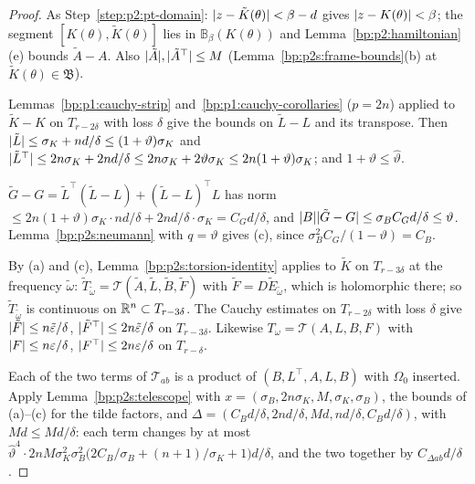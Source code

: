 \begin{proof}
\label{step:p2s:pt-domain}
As Step~\ref{step:p2:pt-domain}: $\lvert z-\tilde K(\theta)\rvert<\beta-d$ gives $\lvert z-K(\theta)\rvert<\beta$; the segment $[K(\theta),\tilde K(\theta)]$ lies in
$\mathbb B_\beta(K(\theta))$ and Lemma~\ref{bp:p2:hamiltonian}(e) bounds $\tilde A-A$. Also $\lvert \tilde A\rvert,\lvert \tilde A^\top\rvert\le M$
(Lemma~\ref{bp:p2s:frame-bounds}(b) at $\tilde K(\theta)\in\mathfrak B$).

\label{step:p2s:pt-l}
Lemmas~\ref{bp:p1:cauchy-strip} and~\ref{bp:p1:cauchy-corollaries} ($p=2n$) applied to $\tilde K-K$ on $T_{r-2\delta}$ with loss $\delta$ give
the bounds on $\tilde L-L$ and its transpose. Then $\lvert \tilde L\rvert\le\sigma_K+nd/\delta\le(1+\vartheta)\sigma_K$ and
$\lvert \tilde L^\top\rvert\le2n\sigma_K+2nd/\delta\le2n\sigma_K+2\vartheta\sigma_K\le2n(1+\vartheta)\sigma_K$; and $1+\vartheta\le\hat\vartheta$.

\label{step:p2s:pt-b}
$\tilde G-G=\tilde L^\top(\tilde L-L)+(\tilde L-L)^\top L$ has norm $\le2n(1+\vartheta)\sigma_K\cdot nd/\delta+2nd/\delta\cdot\sigma_K=C_Gd/\delta$, and
$\lvert B\rvert\lvert \tilde G-G\rvert\le\sigma_BC_Gd/\delta\le\vartheta$. Lemma~\ref{bp:p2s:neumann} with $q=\vartheta$ gives (c), since
$\sigma_B^2C_G/(1-\vartheta)=C_B$.

\label{step:p2s:pt-tt}
By (a) and (c), Lemma~\ref{bp:p2s:torsion-identity} applies to $\tilde K$ on $T_{r-3\delta}$ at the frequency $\tilde\omega$:
$\tilde T_{\tilde\omega}=\mathcal T(\tilde A,\tilde L,\tilde B,\tilde F)$ with $\tilde F=D\tilde E_{\tilde\omega}$, which is holomorphic there; so
$\tilde T_{\tilde\omega}$ is continuous on $\mathbb{R}^n\subset T_{r-3\delta}$. The Cauchy estimates on $T_{r-2\delta}$ with loss $\delta$ give
$\lvert \tilde F\rvert\le n\tilde\varepsilon/\delta$, $\lvert \tilde F^\top\rvert\le2n\tilde\varepsilon/\delta$ on $T_{r-3\delta}$. Likewise
$T_\omega=\mathcal T(A,L,B,F)$ with $\lvert F\rvert\le n\varepsilon/\delta$, $\lvert F^\top\rvert\le2n\varepsilon/\delta$ on $T_{r-\delta}$.

\label{step:p2s:pt-ab}
Each of the two terms of $\mathcal T_{ab}$ is a product of $(B,L^\top,A,L,B)$ with $\Omega_0$ inserted. Apply
Lemma~\ref{bp:p2s:telescope} with $x=(\sigma_B,2n\sigma_K,M,\sigma_K,\sigma_B)$, the bounds of (a)--(c) for the tilde factors, and
$\Delta=(C_Bd/\delta,2nd/\delta,Md,nd/\delta,C_Bd/\delta)$, with $Md\le Md/\delta$: each term changes by at most
$\hat\vartheta^4\cdot2nM\sigma_K^2\sigma_B^2\bigl(2C_B/\sigma_B+(n+1)/\sigma_K+1\bigr)d/\delta$, and the two together by $C_{\Delta ab}d/\delta$.


\end{proof}
